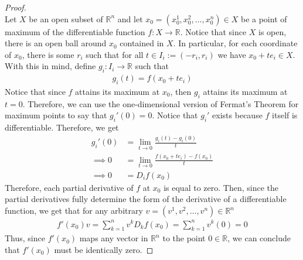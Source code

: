 \documentclass[10pt,a4paper]{article}
\theoremstyle{definition}
\theoremstyle{definition}
\numberwithin{equation}{section}
\begin{document}
\begin{proof}$ $
\\Let $X$ be an open subset of $\mathbb{R}^n$ and let $x_0 = (x_0^1, x_0^2, \ldots, x_0^n) \in X$ be a point of maximum of the differentiable function $f: X \to \mathbb{R}$. Notice that since $X$ is open, there is an open ball around $x_0$ contained in $X$. In particular, for each coordinate of $x_0$, there is some $r_i$ such that for all $t \in I_i := (-r_i, r_i)$ we have $x_0 + te_i \in X$. With this in mind, define $g_i : I_i \to \mathbb{R}$ such that 
\begin{align*}
g_i(t) = f(x_0 + te_i)
\end{align*}
Notice that since $f$ attains its maximum at $x_0$, then $g_i$ attains its maximum at $t = 0$. Therefore, we can use the one-dimensional version of Fermat's Theorem for maximum points to say that $g_i'(0) = 0$. Notice that $g_i'$ exists because $f$ itself is differentiable. Therefore, we get
\begin{align*}
g_i'(0) &= \lim_{t \to 0} \frac{g_i(t) - g_i(0)}{t}\\
\implies 0 &= \lim_{t \to 0} \frac{f(x_0 + te_i) - f(x_0)}{t}\\
\implies 0 &= D_i f(x_0)
\end{align*}
Therefore, each partial derivative of $f$ at $x_0$ is equal to zero. Then, since the partial derivatives fully determine the form of the derivative of a differentiable function, we get that for any arbitrary $v = (v^1, v^2, \ldots, v^n) \in \mathbb{R}^n$
\begin{align*}
f'(x_0)v = \sum_{k = 1}^n v^k D_k f(x_0) = \sum_{k = 1}^n v^k (0) = 0
\end{align*}
Thus, since $f'(x_0)$ maps any vector in $\mathbb{R}^n$ to the point $0 \in \mathbb{R}$, we can conclude that $f'(x_0)$ must be identically zero. 
\end{proof}
\end{document}
